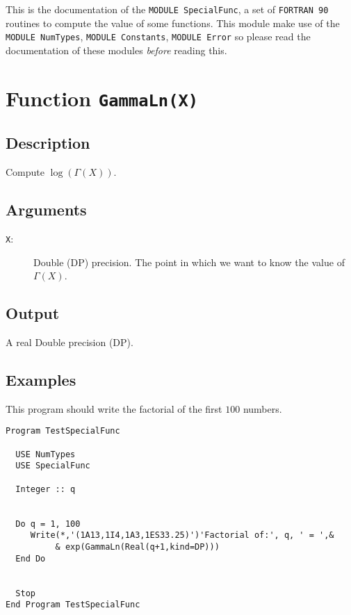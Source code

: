 This is the documentation of the \texttt{MODULE SpecialFunc}, a set
of \texttt{FORTRAN 90} routines to compute the value of some
functions. This module make use of the \texttt{MODULE NumTypes},
\texttt{MODULE Constants}, \texttt{MODULE Error} so please read the
documentation of these modules \emph{before} reading this.

\section{Function \texttt{GammaLn(X)}}

\subsection{Description}

Compute $\log(\Gamma(X))$.

\subsection{Arguments}

\begin{description}
\item[\texttt{X}:] Double (DP) precision. The point in which we want to
  know the value of $\Gamma(X)$.
\end{description}

\subsection{Output}

A real Double precision (DP).

\subsection{Examples}

This program should write the factorial of the first $100$ numbers.

\begin{lstlisting}[emph=GammaLn,
                   emphstyle=\color{blue},
                   frame=trBL,
                   caption=Computing the Gamma Function.,
                   label=gammaln]
Program TestSpecialFunc

  USE NumTypes
  USE SpecialFunc

  Integer :: q


  Do q = 1, 100
     Write(*,'(1A13,1I4,1A3,1ES33.25)')'Factorial of:', q, ' = ',&
          & exp(GammaLn(Real(q+1,kind=DP)))
  End Do


  Stop
End Program TestSpecialFunc
\end{lstlisting}

